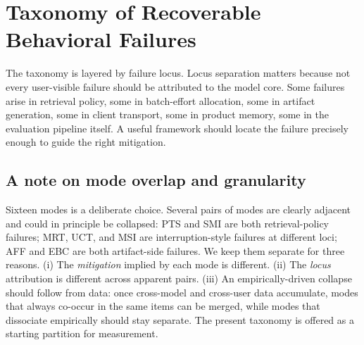 \documentclass[11pt]{article}
\begin{document}
\section{Taxonomy of Recoverable Behavioral Failures}
\label{sec:taxonomy}

The taxonomy is layered by failure locus. Locus separation matters because not every user-visible failure should be attributed to the model core. Some failures arise in retrieval policy, some in batch-effort allocation, some in artifact generation, some in client transport, some in product memory, some in the evaluation pipeline itself. A useful framework should locate the failure precisely enough to guide the right mitigation.

\subsection{A note on mode overlap and granularity}
Sixteen modes is a deliberate choice. Several pairs of modes are clearly adjacent and could in principle be collapsed: PTS and SMI are both retrieval-policy failures; MRT, UCT, and MSI are interruption-style failures at different loci; AFF and EBC are both artifact-side failures. We keep them separate for three reasons. (i) The \emph{mitigation} implied by each mode is different. (ii) The \emph{locus} attribution is different across apparent pairs. (iii) An empirically-driven collapse should follow from data: once cross-model and cross-user data accumulate, modes that always co-occur in the same items can be merged, while modes that dissociate empirically should stay separate. The present taxonomy is offered as a starting partition for measurement.
\end{document}
